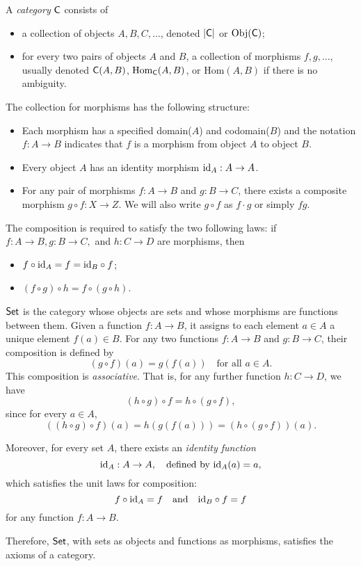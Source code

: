 \begin{definition}
   A \emph{category} $\mathsf{C}$ consists of
   \begin{itemize}
    \item a collection of objects $A, B, C, \ldots$, denoted $|\mathsf{C}|$ or $\text{Obj}(\mathsf{C})$;
    \item for every two pairs of objects $A$ and $B$, a collection of morphisms $f, g, \ldots $, usually denoted $\mathsf{C}(A,B)$, $\mathrm{Hom}_{\mathsf{C}}(A,B)$, or $\mathrm{Hom}(A,B)$ if there is no ambiguity. 
   \end{itemize}
    The collection for morphisms has the following structure:
    \begin{itemize}
      \item Each morphism has a specified domain($A$) and codomain($B$) and the notation $ f : A \to B $ indicates that $ f $ is a morphism from object $ A $ to object $ B $.  
       \item Every object $ A $ has an identity morphism $ \mathrm{id}_A : A \to A $.  
      \item For any pair of morphisms $ f : A \to B $ and $ g : B \to C $, there exists a composite morphism $ g \circ f : X \to Z $. We will also write $g \circ f$ as $f \cdot g$ or simply $f g$.
    \end{itemize}

     The composition is required to satisfy the two following laws: if $f : A \to B, g : B \to C,$ and $h:C \to D$ are morphisms, then
     \begin{itemize}
      \item  $f \circ \mathrm{id}_A = f = \mathrm{id}_B \circ f$;
      \item  $  (f \circ g) \circ h = f \circ (g \circ h) $.
     \end{itemize}
\end{definition}





\begin{example}
 $\mathsf{Set}$ is the category whose objects are sets and whose  morphisms are functions between them. Given a function \(f: A \to B\), it assigns to each element \(a \in A\) a unique element \(f(a) \in B\). 
 For any two functions \(f: A \to B\) and \(g: B \to C\), their composition is defined by
$$
(g \circ f)(a) = g(f(a)) \quad \text{for all } a \in A.
$$
This composition is \emph{associative}. That is, for any further function \(h: C \to D\), we have
\[
(h \circ g) \circ f = h \circ (g \circ f),
\]
since for every \(a \in A\),
\[
((h \circ g) \circ f)(a) = h(g(f(a))) = (h \circ (g \circ f))(a).
\]

Moreover, for every set \(A\), there exists an \emph{identity function}
\[
\mathrm{id}_A : A \to A, \quad \text{defined by } \mathrm{id}_A(a) = a,
\]
which satisfies the unit laws for composition:
\[
f \circ \mathrm{id}_A = f \quad \text{and} \quad \mathrm{id}_B \circ f = f
\]
for any function \(f: A \to B\).

Therefore, \(\mathsf{Set}\), with sets as objects and functions as morphisms, satisfies the axioms of a category.
\end{example}

